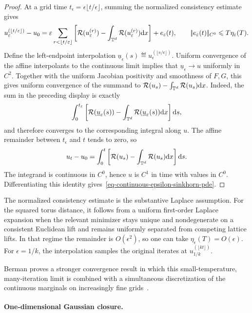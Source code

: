 \begin{proof}
	At a grid time $t_\epsilon=\epsilon\lfloor t/\epsilon\rfloor$, summing the normalized consistency estimate gives
	\[
		u_\varepsilon^{(\lfloor t/\varepsilon\rfloor)}-u_0
		=
		\varepsilon\sum_{r<\lfloor t/\varepsilon\rfloor}
		\left[
			\mathcal R(u_\varepsilon^{(r)})
			-\int_{\mathbb{T}^d}\mathcal R(u_\varepsilon^{(r)})\mathrm{d} x
		\right]
		+e_\varepsilon(t),
		\qquad
		|\!| e_\varepsilon(t) |\!|_{C^0}\leqslant T\eta_\varepsilon(T).
	\]
	Define the left-endpoint interpolation $\underline u_\epsilon(s)\eqdef u_\epsilon^{(\lfloor s/\epsilon\rfloor)}$. Uniform convergence of the affine interpolants to the continuous limit implies that $\underline u_\epsilon\to u$ uniformly in $C^2$. Together with the uniform Jacobian positivity and smoothness of $F,G$, this gives uniform convergence of the summand to
	\(
		\mathcal R(u_s)-\int_{\mathbb{T}^d}\mathcal R(u_s)\mathrm{d} x
	\).
	Indeed, the sum in the preceding display is exactly
	\[
		\int_0^{t_\varepsilon}
		\left[
			\mathcal R(\underline u_\varepsilon(s))
			-\int_{\mathbb{T}^d}\mathcal R(\underline u_\varepsilon(s))\mathrm{d} x
		\right]\mathrm{d} s,
	\]
	and therefore converges to the corresponding integral along $u$. The affine remainder between $t_\epsilon$ and $t$ tends to zero, so
	\[
		u_t-u_0
		=
		\int_0^t
		\left[
			\mathcal R(u_s)-\int_{\mathbb{T}^d}\mathcal R(u_s)\mathrm{d} x
		\right]\mathrm{d} s.
	\]
	The integrand is continuous in $C^0$, hence $u$ is $C^1$ in time with values in $C^0$. Differentiating this identity gives~\eqref{eq-continuous-epsilon-sinkhorn-pde}.
\end{proof}

The normalized consistency estimate is the substantive Laplace assumption. For the squared torus distance, it follows from a uniform first-order Laplace expansion when the relevant minimizer stays unique and nondegenerate on a consistent Euclidean lift and remains uniformly separated from competing lattice lifts. In that regime the remainder is $O(\epsilon^2)$, so one can take $\eta_\epsilon(T)=O(\epsilon)$. For $\epsilon=1/k$, the interpolation samples the original iterates at $u_{1/k}^{(\lfloor kt\rfloor)}$.

Berman proves a stronger convergence result in which this small-temperature, many-iteration limit is combined with a simultaneous discretization of the continuous marginals on increasingly fine grids~\cite{berman2017sinkhorn}.

\paragraph{One-dimensional Gaussian closure.}


